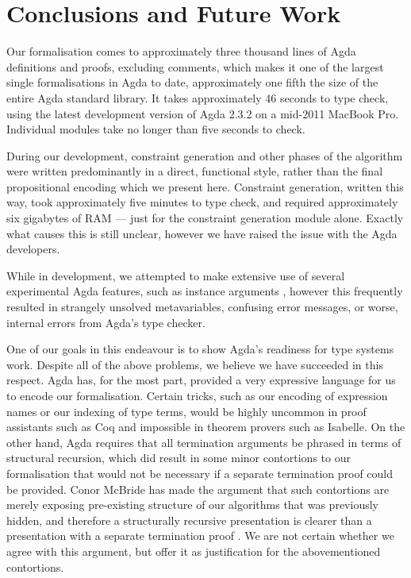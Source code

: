 \documentclass[a4paper]{jfp}
\begin{document}
\newpage
\section{Conclusions and Future Work}

Our formalisation comes to approximately three thousand lines of Agda definitions and proofs, excluding comments, which makes it one of the largest
single formalisations in Agda to date, approximately one fifth the size of the entire Agda standard library. It takes approximately 46 seconds to
type check, using the latest development version of Agda 2.3.2 on a mid-2011 MacBook Pro. Individual modules take no longer than five seconds to
check. 

During our development, constraint generation and other phases of the algorithm were written predominantly in a direct, functional style, rather
than the final propositional encoding which we present here. Constraint generation, written this way, took approximately five minutes to type check,
and required approximately six gigabytes of RAM --- just for the constraint generation module alone. Exactly what causes this is still unclear,
however we have raised the issue with the Agda developers.

While in development, we attempted to make extensive use of several experimental Agda features, such as instance arguments \cite{Devriese:2011gp},
however this frequently resulted in strangely unsolved metavariables, confusing error messages, or worse, internal errors from Agda's type checker.

One of our goals in this endeavour is to show Agda's readiness for type systems work. Despite all of the above problems, we believe we have succeeded
in this respect. Agda has, for the most part, provided a very expressive language for us to encode our formalisation. Certain tricks, such as our
encoding of expression names or our indexing of type terms, would be highly uncommon in proof assistants such as Coq and impossible in theorem provers
such as Isabelle. On the other hand, Agda requires that all termination arguments be phrased in terms of structural recursion, which did result in
some minor contortions to our formalisation that would not be necessary if a separate termination proof could be provided. Conor McBride has made the
argument that such contortions are merely exposing pre-existing structure of our algorithms that was previously hidden, and therefore a structurally
recursive presentation is clearer than a presentation with a separate termination proof \cite{McBride:2003bg}. We are not certain whether we agree
with this argument, but offer it as justification for the abovementioned contortions.
\end{document}
